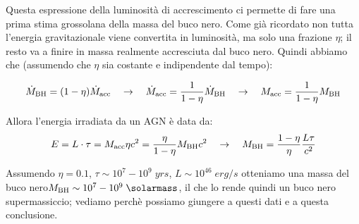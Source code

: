 Questa espressione della luminosità di accrescimento ci permette di fare una prima stima grossolana della massa del buco nero. Come già ricordato non tutta l’energia gravitazionale viene convertita in luminosità, ma solo una frazione $\eta$; il resto va a finire in massa realmente accresciuta dal buco nero. Quindi abbiamo che (assumendo che $\eta$ sia costante e indipendente dal tempo):

\begin{equation*}
    \dot{M}_\textup{BH} = (1-\eta) \dot{M}_\textup{acc} \quad \rightarrow \quad \dot{M}_\textup{acc} = \frac{1}{1 - \eta} \dot{M}_\textup{BH}
    \quad \rightarrow \quad M_\textup{acc} = \frac{1}{1 - \eta} M_\textup{BH}
\end{equation*}

Allora l'energia irradiata da un AGN è data da:
\begin{equation*}
    E = L \cdot \tau =  M_\textup{acc} \eta c^2 = \frac{\eta}{1 - \eta} M_\textup{BH} c^2 \quad \rightarrow \quad M_\textup{BH} = \frac{1-\eta}{\eta} \frac{L\tau}{c^2}
\end{equation*}

Assumendo $\eta = 0.1$, $\tau \sim 10^7-10^9 \;\si{yrs}$, $L \sim 10^{46} \;\si{erg}/\si{s}$ otteniamo una massa del buco nero$M_\textup{BH} \sim 10^7-10^9 \;\si{\solarmass}$, il che lo rende quindi un buco nero supermassiccio; vediamo perchè possiamo giungere a questi dati e a questa conclusione.

